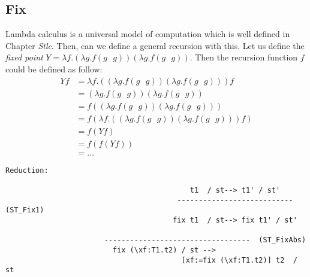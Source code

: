 \subsection{Fix}
Lambda calculus is a universal model of computation which is well defined in Chapter \textit{Stlc}. Then, can we define a general recursion with this. Let us define the \textit{fixed point} $Y = \lambda f. (\lambda g. f(g\text{ }g))(\lambda g. f(g\text{ }g))$. Then the recursion function $f$ could be defined as follow:
\begin{align*}
Yf &=  \lambda f. ((\lambda g. f(g\text{ }g))(\lambda g. f(g\text{ }g))) f \\
&=  (\lambda g. f(g\text{ }g))(\lambda g. f(g\text{ }g)) \\
&= f ((\lambda g. f(g\text{ }g))(\lambda g. f(g\text{ }g))) \\
&= f (\lambda f. ((\lambda g. f(g\text{ }g))(\lambda g. f(g\text{ }g))) f ) \\
&= f(Yf)\\
&= f(f(Yf))\\
&= ...
\end{align*}
\begin{lstlisting}
Reduction:

									       t1  / st--> t1' / st'
										---------------------------    (ST_Fix1)
									   fix t1  / st--> fix t1' / st'
				
					   ----------------------------------  (ST_FixAbs)
					     fix (\xf:T1.t2) / st --> 
					    				 [xf:=fix (\xf:T1.t2)] t2  / st
\end{lstlisting}

